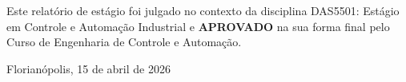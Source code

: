 \documentclass[
	12pt,				%
	openright,			%
	oneside,			%
	a4paper,			%
	english,			%
	brazil				%
	]{abntex2}
\begin{document}
%
% 
%
\makeatletter
\begin{folhadeaprovacao}

  \begin{center}
    {\ABNTEXchapterfont\large\imprimirautor}

    \vspace*{\fill}\vspace*{\fill}
    \begin{center}
      \ABNTEXchapterfont\bfseries\Large\imprimirtitulo
    \end{center}
    \vspace*{\fill}
    
    Este relatório de estágio foi julgado no contexto da disciplina DAS5501: Estágio em Controle e Automação Industrial e \textbf{APROVADO} na sua forma final pelo Curso de Engenharia de Controle e Automação.
    
    \vspace*{\fill}
    
    Florianópolis, 15 de abril de 2026
  \end{center}
  
   
      
\makeatother
   
        
\end{folhadeaprovacao}



\setlength{\absparsep}{18pt} %
\begin{resumo}
	
\end{resumo}
\end{document}
